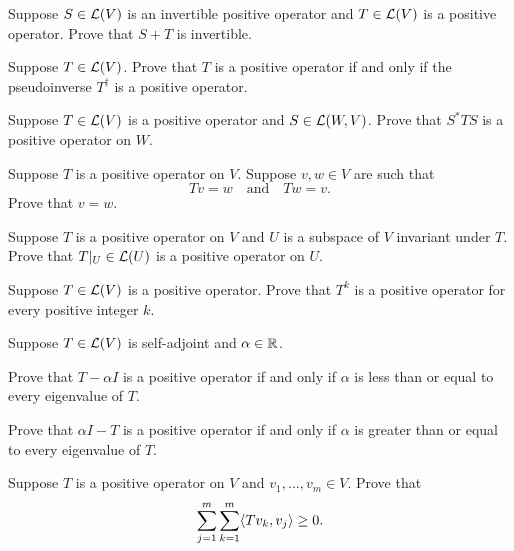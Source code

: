 \begin{exc}
\begin{exercise}
Suppose $S\in\mathcal{L}(V)$ is an invertible positive operator and $T\in\mathcal{L}(V)$ is a
positive operator. Prove that $S+T$ is invertible.
\end{exercise}

\begin{exercise}
Suppose $T\in\mathcal{L}(V)$. Prove that $T$ is a positive operator if and only if the
pseudoinverse $T^\dagger$ is a positive operator.
\end{exercise}

\begin{exercise}
Suppose $T\in\mathcal{L}(V)$ is a positive operator and $S\in\mathcal{L}(W,V)$. Prove that
$S^*TS$ is a positive operator on $W$.
\end{exercise}

\begin{exercise}
Suppose $T$ is a positive operator on $V$. Suppose $v,w\in V$ are such that
\[ Tv=w \quad\text{and}\quad Tw=v. \]
Prove that $v=w$.
\end{exercise}

\begin{exercise}
Suppose $T$ is a positive operator on $V$ and $U$ is a subspace of $V$
invariant under $T$. Prove that $T|_U\in\mathcal{L}(U)$ is a positive operator on $U$.
\end{exercise}

\begin{exercise}
Suppose $T\in\mathcal{L}(V)$ is a positive operator. Prove that $T^k$ is a positive
operator for every positive integer $k$.
\end{exercise}

\begin{exercise}
Suppose $T\in\mathcal{L}(V)$ is self-adjoint and $\alpha\in\mathbb{R}$.
\begin{parts}
\item Prove that $T-\alpha I$ is a positive operator if and only if $\alpha$ is
  less than or equal to every eigenvalue of $T$.
\item Prove that $\alpha I-T$ is a positive operator if and only if $\alpha$ is
  greater than or equal to every eigenvalue of $T$.
\end{parts}
\end{exercise}

\begin{exercise}
Suppose $T$ is a positive operator on $V$ and $v_1,\dots,v_m\in V$. Prove that
\[ \sum_{j=1}^m\sum_{k=1}^m\langle Tv_k, v_j \rangle\ge0. \]
\end{exercise}


\end{exc}
